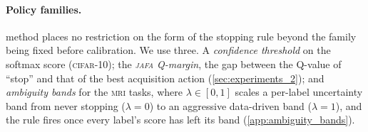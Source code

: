 \paragraph{Policy families.}
\gls{method} places no restriction on the form of the stopping rule beyond the family being fixed before calibration. We use three. A \emph{confidence threshold} on the softmax score (\textsc{cifar}-10); the \emph{\textsc{jafa} Q-margin}, the gap between the Q-value of ``stop'' and that of the best acquisition action (\cref{sec:experiments_2}); and \emph{ambiguity bands} for the \textsc{mri} tasks, where $\lambda \in [0,1]$ scales a per-label uncertainty band from never stopping ($\lambda = 0$) to an aggressive data-driven band ($\lambda = 1$), and the rule fires once every label's score has left its band (\cref{app:ambiguity_bands}).
